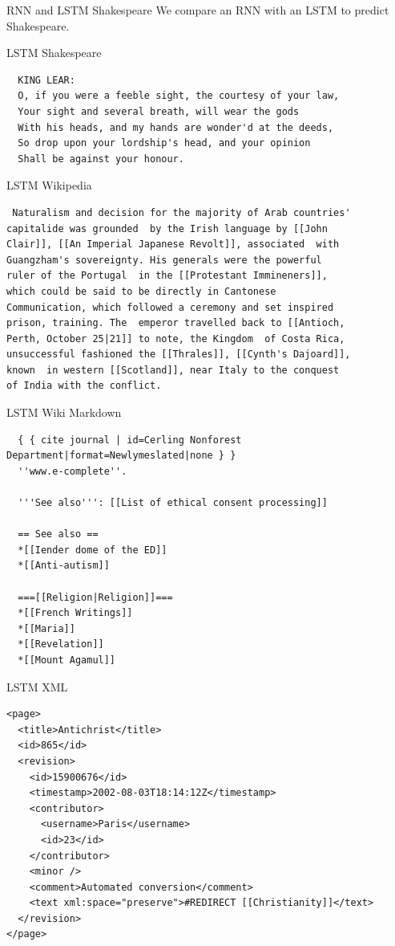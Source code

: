 \documentclass[10pt,xcolor=dvipsnames]{beamer}
\begin{document}
\begin{frame}{RNN and LSTM Shakespeare}
  We compare an RNN with an LSTM to predict Shakespeare.
\end{frame}

\begin{frame}[fragile]{LSTM Shakespeare}
  \begin{lstlisting}
  KING LEAR:
  O, if you were a feeble sight, the courtesy of your law,
  Your sight and several breath, will wear the gods
  With his heads, and my hands are wonder'd at the deeds,
  So drop upon your lordship's head, and your opinion
  Shall be against your honour.
  \end{lstlisting}
\end{frame}

\begin{frame}[fragile]{LSTM Wikipedia}
  \begin{lstlisting}
 Naturalism and decision for the majority of Arab countries'
capitalide was grounded  by the Irish language by [[John
Clair]], [[An Imperial Japanese Revolt]], associated  with
Guangzham's sovereignty. His generals were the powerful
ruler of the Portugal  in the [[Protestant Immineners]],
which could be said to be directly in Cantonese 
Communication, which followed a ceremony and set inspired
prison, training. The  emperor travelled back to [[Antioch,
Perth, October 25|21]] to note, the Kingdom  of Costa Rica,
unsuccessful fashioned the [[Thrales]], [[Cynth's Dajoard]],
known  in western [[Scotland]], near Italy to the conquest
of India with the conflict. 
  \end{lstlisting}
\end{frame}

\begin{frame}[fragile]{LSTM Wiki Markdown}
  \begin{lstlisting}
  { { cite journal | id=Cerling Nonforest Department|format=Newlymeslated|none } }
  ''www.e-complete''.
  
  '''See also''': [[List of ethical consent processing]]
  
  == See also ==
  *[[Iender dome of the ED]]
  *[[Anti-autism]]
  
  ===[[Religion|Religion]]===
  *[[French Writings]]
  *[[Maria]]
  *[[Revelation]]
  *[[Mount Agamul]]
  \end{lstlisting}
\end{frame}

\begin{frame}[fragile]{LSTM XML}
  \begin{lstlisting}
<page>
  <title>Antichrist</title>
  <id>865</id>
  <revision>
    <id>15900676</id>
    <timestamp>2002-08-03T18:14:12Z</timestamp>
    <contributor>
      <username>Paris</username>
      <id>23</id>
    </contributor>
    <minor />
    <comment>Automated conversion</comment>
    <text xml:space="preserve">#REDIRECT [[Christianity]]</text>
  </revision>
</page>
  \end{lstlisting}
\end{frame}
\end{document}
